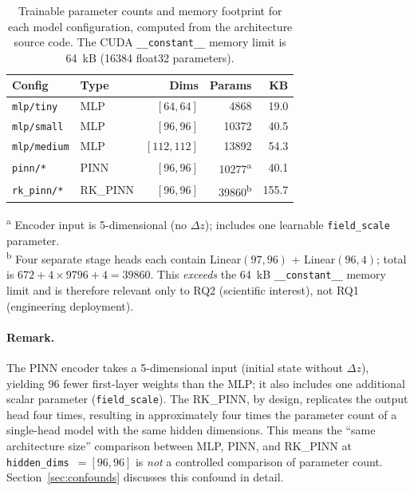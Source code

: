 \documentclass[a4paper,11pt]{article}
\newcommand{\SI}[2]{#1~#2}
\newcommand{\num}[1]{#1}
\newcommand{\kilo}{k}
\newcommand{\byte}{B}
\newcommand{\dz}{\Delta z}
\begin{document}
\begin{table}[htbp]
\centering
\caption{Trainable parameter counts and memory footprint for each
model configuration, computed from the architecture source code.  The
CUDA \texttt{\_\_constant\_\_} memory limit is \SI{64}{\kilo\byte}
(\num{16384} float32 parameters).}
\label{tab:param_counts}
\begin{tabular}{llrrr}
Config & Type & Dims & Params & KB \\
\hline
\texttt{mlp/tiny}   & MLP & $[64,64]$   & \num{4868}  & 19.0 \\
\texttt{mlp/small}  & MLP & $[96,96]$   & \num{10372} & 40.5 \\
\texttt{mlp/medium} & MLP & $[112,112]$ & \num{13892} & 54.3 \\
\texttt{pinn/*}     & PINN & $[96,96]$  & \num{10277}\textsuperscript{a}
                                                       & 40.1 \\
\texttt{rk\_pinn/*} & RK\_PINN & $[96,96]$
                     & \num{39860}\textsuperscript{b} & 155.7 \\
\end{tabular}
\begin{flushleft}
\textsuperscript{a} Encoder input is 5-dimensional (no $\dz$); includes
one learnable \texttt{field\_scale} parameter. \\
\textsuperscript{b} Four separate stage heads each contain
Linear$(97, 96)$ + Linear$(96, 4)$; total is $672 + 4 \times 9796 + 4 =
\num{39860}$.  This \emph{exceeds} the \SI{64}{\kilo\byte}
\texttt{\_\_constant\_\_} memory limit and is therefore relevant only to
RQ2 (scientific interest), not RQ1 (engineering deployment).
\end{flushleft}
\end{table}

\paragraph{Remark.}
The PINN encoder takes a 5-dimensional input (initial state without
$\dz$), yielding 96 fewer first-layer weights than the MLP; it also
includes one additional scalar parameter (\texttt{field\_scale}).  The
RK\_PINN, by design, replicates the output head four times, resulting in
approximately four times the parameter count of a single-head model with
the same hidden dimensions.  This means the ``same architecture size''
comparison between MLP, PINN, and RK\_PINN at \texttt{hidden\_dims}~$=
[96, 96]$ is \emph{not} a controlled comparison of parameter count.
Section~\ref{sec:confounds} discusses this confound in detail.
\end{document}
